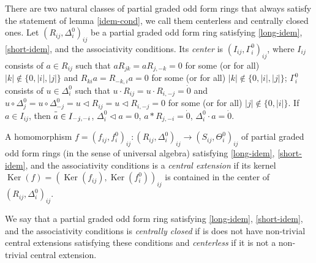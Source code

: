 \documentclass{article}
\theoremstyle{definition}
\DeclareMathOperator\Ker{Ker}
\newcommand{\inv}[1]{
    \!\;\overline{
        \!\!\:#1\vphantom !\!\!\:
    }\;\!
}
\begin{document}
There are two natural classes of partial graded odd form rings that always satisfy the statement of lemma \ref{idem-cond}, we call them centerless and centrally closed ones. Let \(
    (R_{ij}, \Delta^0_i)_{ij}
\) be a partial graded odd form ring satisfying \ref{long-idem}, \ref{short-idem}, and the associativity conditions. Its \textit{center} is \(
    (I_{ij}, \Gamma^0_i)_{ij}
\), where \(I_{ij}\) consists of \(a \in R_{ij}\) such that \(
    a R_{jk} = a R_{j, -k} = 0
\) for some (or for all) \(
    |k| \notin \{0, |i|, |j|\}
\) and \(
    R_{ki} a = R_{-k, i} a = 0
\) for some (or for all) \(
    |k| \notin \{0, |i|, |j|\}
\); \(\Gamma^0_i\) consists of \(u \in \Delta^0_i\) such that \(
    u \cdot R_{ij} = u \cdot R_{i, -j} = \dot 0
\) and \(
    u \circ \Delta^0_j
    =
    u \circ \Delta^0_{-j}
    =
    u \triangleleft R_{ij}
    =
    u \triangleleft R_{i, -j}
    = 0
\) for some (or for all) \(
    |j| \notin \{0, |i|\}
\). If \(a \in I_{ij}\), then \(
    \inv a \in I_{-j, -i}
\), \(
    \Delta^0_i \triangleleft a = 0
\), \(
    a * R_{j, -i} = \dot 0
\), \(
    \Delta^0_i \cdot a = \dot 0
\).

A homomorphism \(
    f = (f_{ij}, f_i^0)_{ij}
    \colon (R_{ij}, \Delta^0_i)_{ij}
    \to (S_{ij}, \Theta^0_i)_{ij}
\) of partial graded odd form rings (in the sense of universal algebra) satisfying \ref{long-idem}, \ref{short-idem}, and the associativity conditions is a \textit{central extension} if its kernel \(
    \Ker(f) = (\Ker(f_{ij}), \Ker(f_i^0))_{ij}
\) is contained in the center of \(
    (R_{ij}, \Delta^0_i)_{ij}
\).

We say that a partial graded odd form ring satisfying \ref{long-idem}, \ref{short-idem}, and the associativity conditions is \textit{centrally closed} if is does not have non-trivial central extensions satisfying these conditions and \textit{centerless} if it is not a non-trivial central extension.
\end{document}
